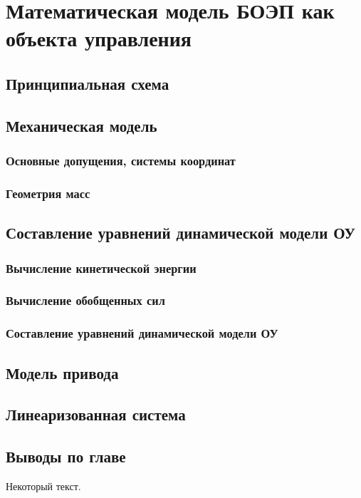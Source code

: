 \chapter{Математическая модель БОЭП как объекта управления} \label{ch:ch3}

\section{Принципиальная схема} \label{ch:ch3/sect1}

\section{Механическая модель} \label{ch:ch3/sect1}

\subsection{Основные допущения, системы координат} \label{sec:ch2/sec1}

\subsection{Геометрия масс} \label{sec:ch2/sec1}

\section{Составление уравнений динамической модели ОУ} \label{ch:ch3/sect1}


\subsection{Вычисление кинетической энергии} \label{sec:ch2/sec1}

\subsection{Вычисление обобщенных сил} \label{sec:ch2/sec1}

\subsection{Составление уравнений динамической модели ОУ} \label{sec:ch2/sec1}


\section{Модель привода} \label{ch:ch3/sect1}

\section{Линеаризованная система} \label{ch:ch3/sect1}

\section{Выводы по главе} \label{ch:ch3/sect1}


Некоторый текст.

\clearpage